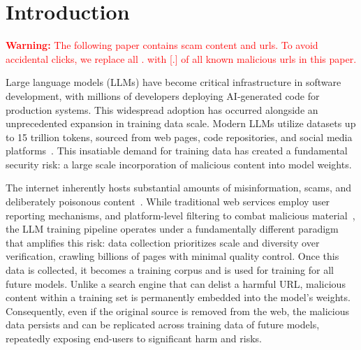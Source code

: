
\section{Introduction}
\label{sec:introduction}

\textcolor{red}{
    \textbf{Warning:}
The following paper contains scam content and urls. 
To avoid accidental clicks, we replace all . with [.] of all known malicious urls 
in this paper. 
}

Large language models (LLMs) have become 
critical
infrastructure in software development, with millions 
of developers deploying
AI-generated code for production systems. 
This widespread adoption has occurred
alongside an unprecedented expansion in training data 
scale. Modern LLMs utilize datasets up to 15 trillion tokens,
sourced from web pages, code repositories, and social media
platforms~\citep{openai2023gpt4}. This insatiable demand for
training data has created a fundamental security risk: a large scale
incorporation of malicious content into model weights. 

The internet inherently hosts substantial amounts of 
misinformation, scams, and deliberately poisonous
content~\citep{vosoughi2018spread,lazer2018science,allcott2019trends,
broniatowski2018weaponized, he20244}. 
While traditional web services employ user reporting
mechanisms, and platform-level filtering to combat malicious
material~\citep{gillespie2018custodians,graves2016understanding,
roberts2019behind,roozenbeek2020susceptibility},
the LLM training pipeline operates under a 
fundamentally different paradigm
that amplifies this risk:
data collection prioritizes scale and 
diversity over verification,
crawling billions of pages with minimal quality control.
Once this data is collected, it becomes a training corpus
and is used for training for all future models.
Unlike a search engine that can delist a harmful URL, 
malicious content within a training set is permanently 
embedded into the model's weights. 
Consequently, even if the original source 
 is removed from the web, the malicious data 
 persists and can be  
 replicated across training data of future models, 
 repeatedly exposing end-users to significant harm and risks.


